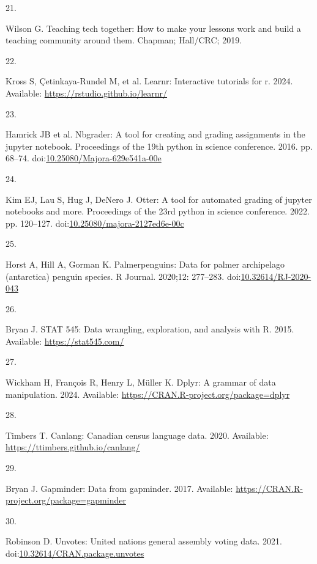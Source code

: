 \documentclass[
  10pt,
  letterpaper,
]{article}
\newlength{\cslhangindent}
\newlength{\csllabelwidth}
\newenvironment{CSLReferences}[2] %
 {\begin{list}{}{%
  \setlength{\itemindent}{0pt}
  \setlength{\leftmargin}{0pt}
  \setlength{\parsep}{0pt}
  \ifodd #1
   \setlength{\leftmargin}{\cslhangindent}
   \setlength{\itemindent}{-1\cslhangindent}
  \fi
  \setlength{\itemsep}{#2\baselineskip}}}
 {\end{list}}
\newcommand{\CSLLeftMargin}[1]{\parbox[t]{\csllabelwidth}{\strut#1\strut}}
\newcommand{\CSLRightInline}[1]{\parbox[t]{\linewidth - \csllabelwidth}{\strut#1\strut}}
\begin{document}
\begin{CSLReferences}{0}{1}
\CSLLeftMargin{21. }%
\CSLRightInline{Wilson G. Teaching tech together: How to make your
lessons work and build a teaching community around them. Chapman;
Hall/CRC; 2019. }

\CSLLeftMargin{22. }%
\CSLRightInline{Kross S, Çetinkaya-Rundel M, et al. Learnr: Interactive
tutorials for r. 2024. Available:
\url{https://rstudio.github.io/learnr/}}

\CSLLeftMargin{23. }%
\CSLRightInline{Hamrick JB et al. Nbgrader: A tool for creating and
grading assignments in the jupyter notebook. Proceedings of the 19th
python in science conference. 2016. pp. 68--74.
doi:\href{https://doi.org/10.25080/Majora-629e541a-00e}{10.25080/Majora-629e541a-00e}}

\CSLLeftMargin{24. }%
\CSLRightInline{Kim EJ, Lau S, Hug J, DeNero J. Otter: A tool for
automated grading of jupyter notebooks and more. Proceedings of the 23rd
python in science conference. 2022. pp. 120--127.
doi:\href{https://doi.org/10.25080/majora-2127ed6e-00c}{10.25080/majora-2127ed6e-00c}}

\CSLLeftMargin{25. }%
\CSLRightInline{Horst A, Hill A, Gorman K. Palmerpenguins: Data for
palmer archipelago (antarctica) penguin species. R Journal. 2020;12:
277--283.
doi:\href{https://doi.org/10.32614/RJ-2020-043}{10.32614/RJ-2020-043}}

\CSLLeftMargin{26. }%
\CSLRightInline{Bryan J. STAT 545: Data wrangling, exploration, and
analysis with {R}. 2015. Available: \url{https://stat545.com/}}

\CSLLeftMargin{27. }%
\CSLRightInline{Wickham H, François R, Henry L, Müller K. Dplyr: A
grammar of data manipulation. 2024. Available:
\url{https://CRAN.R-project.org/package=dplyr}}

\CSLLeftMargin{28. }%
\CSLRightInline{Timbers T. Canlang: Canadian census language data. 2020.
Available: \url{https://ttimbers.github.io/canlang/}}

\CSLLeftMargin{29. }%
\CSLRightInline{Bryan J. Gapminder: Data from gapminder. 2017.
Available: \url{https://CRAN.R-project.org/package=gapminder}}

\CSLLeftMargin{30. }%
\CSLRightInline{Robinson D. Unvotes: United nations general assembly
voting data. 2021.
doi:\href{https://doi.org/10.32614/CRAN.package.unvotes}{10.32614/CRAN.package.unvotes}}


\end{CSLReferences}
\end{document}
